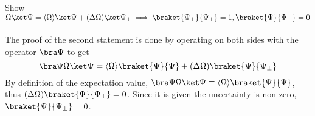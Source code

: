 \begin{sol}
Show $\Omega\ket\Psi=\langle\Omega\rangle\ket\Psi+(\Delta\Omega){\ket\Psi_\perp}\implies\braket{\Psi_\perp}{\Psi_\perp}=1,\braket{\Psi}{\Psi_\perp}=0$\\\\
The proof of the second statement is done by operating on both sides with the operator $\bra\Psi$ to get
$$\bra\Psi\Omega\ket\Psi=\langle\Omega\rangle\braket{\Psi}{\Psi}+(\Delta\Omega)\braket{\Psi}{\Psi_\perp}$$
By definition of the expectation value, $\bra\Psi\Omega\ket\Psi\equiv\langle\Omega\rangle\braket{\Psi}{\Psi}$, thus $(\Delta\Omega)\braket{\Psi}{\Psi_\perp}=0$. Since it is given the uncertainty is non-zero, $\braket{\Psi}{\Psi_\perp}=0$.

\end{sol}